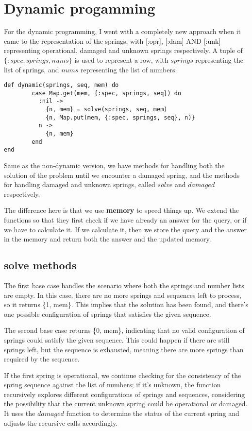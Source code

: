 \documentclass[a4paper,11pt]{article}
\begin{document}
\section*{Dynamic progamming}
For the dynamic programming, I went with a completely new approach when it came to the representation of the springs, with {[:opr]}, {[:dam]} AND {[:unk]} representing operational, damaged and unknown springs respectively. A tuple of $\{:spec, springs, nums\}$ is used to represent a row, with $springs$ representing the list of springs, and $nums$ representing the list of numbers:
\begin{verbatim}
def dynamic(springs, seq, mem) do
        case Map.get(mem, {:spec, springs, seq}) do
          :nil ->
            {n, mem} = solve(springs, seq, mem)
            {n, Map.put(mem, {:spec, springs, seq}, n)}
          n ->
            {n, mem}
        end
end
\end{verbatim}


Same as the non-dynamic version, we have methods for handling both the solution of the problem until we encounter a damaged spring, and the methods for handling damaged and unknown springs, called $solve$ and $damaged$ respectively. 

The difference here is that we use \textbf{memory} to speed things up. We extend the functions so that they first check if we have already an answer for the query, or if we have to calculate it. If we calculate it, then we store the query and the answer in the memory and return both the answer and the updated memory.

\subsection*{solve methods}
The first base case handles the scenario where both the springs and number lists are empty. In this case, there are no more springs and sequences left to process, so it returns \{1, mem\}. This implies that the solution has been found, and there's one possible configuration of springs that satisfies the given sequence. 

The second base case returns \{0, mem\}, indicating that no valid configuration of springs could satisfy the given sequence. This could happen if there are still springs left, but the sequence is exhausted, meaning there are more springs than required by the sequence.

If the first spring is operational, we continue checking for the consistency of the spring sequence against the list of numbers; if it's unknown, the function recursively explores different configurations of springs and sequences, considering the possibility that the current unknown spring could be operational or damaged. It uses the $damaged$ function to determine the status of the current spring and adjusts the recursive calls accordingly.
\end{document}
